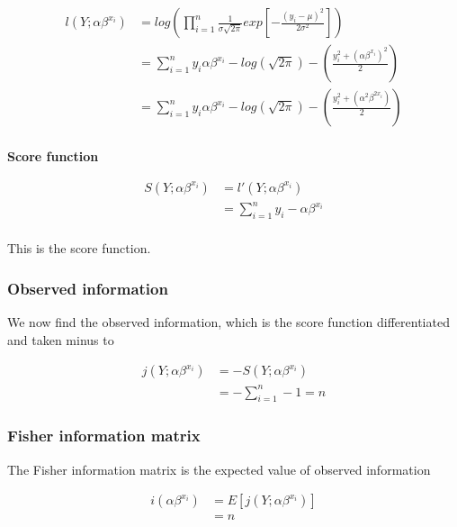 \begin{align*}
   l(Y;\alpha \beta^{x_i}) &= log \left( \prod_{i=1}^n \frac{1}{\sigma \sqrt{2 \pi}}exp\left[-\frac{(y_i -\mu)^2}{2 \sigma^2}\right] \right)\\
   &= \sum_{i = 1}^n y_i \alpha \beta^{x_i} - log\left( \sqrt{2 \pi}\right) - \left( \frac{y_i^2 + (\alpha \beta^{x_i})^2}{2} \right)\\
   &=\sum_{i = 1}^n y_i \alpha \beta^{x_i} - log\left( \sqrt{2 \pi}\right) - \left( \frac{y_i^2 + (\alpha^2 \beta^{2x_i})}{2} \right)\\
\end{align*}

\textbf{Score function}

\begin{align*}
    S\left( Y; \alpha \beta^{x_i} \right) &= l'(Y; \alpha\beta^{x_i})\\
    &= \sum_{i=1}^n y_i - \alpha \beta^{x_i}\\
\end{align*}

This is the score function. 

\subsubsection{Observed information}

We now find the observed information, which is the score function differentiated and taken minus to

\begin{align*}
    j\left( Y; \alpha\beta^{x_i} \right) &= - S\left(Y; \alpha\beta^{x_i} \right)\\
    &=  - \sum_{i=1}^n -1 = n
\end{align*}

\subsubsection{Fisher information matrix}

The Fisher information matrix is the expected value of observed information

\begin{align*}
    i\left(\alpha \beta^{x_i} \right) &= E\left[j(Y;\alpha \beta^{x_i})\right]\\
    &= n
\end{align*}

